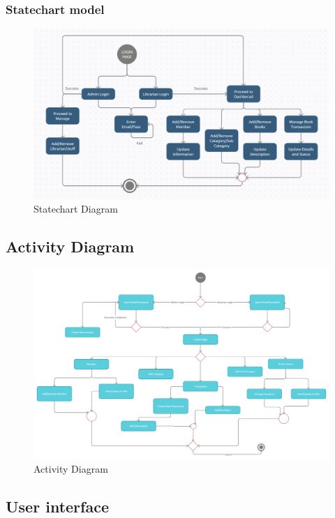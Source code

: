 \subsubsection{Statechart model}
\begin{figure}[H]
    \centering
    \includegraphics[width=\textwidth]{images/statechartr.png}
    \caption{Statechart Diagram}
    \label{fig:statechart_diagram}
\end{figure}

\subsection{Activity Diagram}
\begin{figure}[H]
    \centering
    \includegraphics[width=\textwidth]{images/activity.png}
    \caption{Activity Diagram}
    \label{fig:activity_diagram}
\end{figure}
\newpage
\subsection{User interface}

